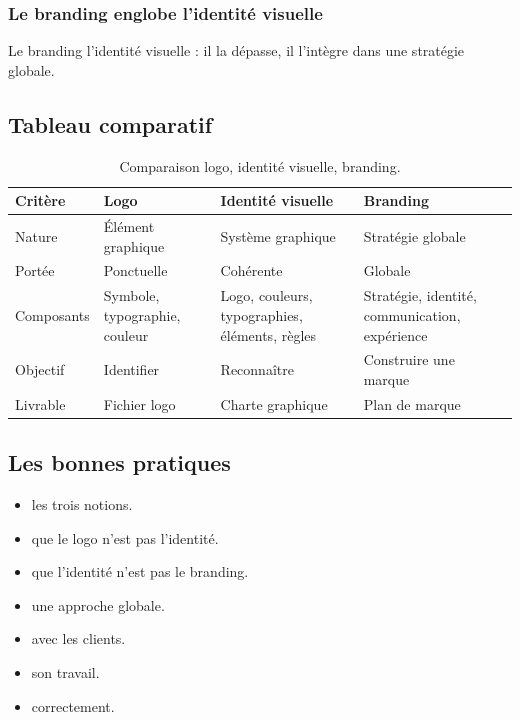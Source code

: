 \subsubsection{Le branding englobe l'identité visuelle}

Le branding  l'identité visuelle : il la dépasse, il l'intègre dans une stratégie globale.

\subsection{Tableau comparatif}

\begin{table}[h!]
\centering
\begin{tabular}{@{}p{3cm}p{4cm}p{4cm}p{3.5cm}@{}}
\toprule
\textbf{Critère} & \textbf{Logo} & \textbf{Identité visuelle} & \textbf{Branding} \\
\midrule
Nature & Élément graphique & Système graphique & Stratégie globale \\
Portée & Ponctuelle & Cohérente & Globale \\
Composants & Symbole, typographie, couleur & Logo, couleurs, typographies, éléments, règles & Stratégie, identité, communication, expérience \\
Objectif & Identifier & Reconnaître & Construire une marque \\
Livrable & Fichier logo & Charte graphique & Plan de marque \\
\bottomrule
\end{tabular}
\caption{Comparaison logo, identité visuelle, branding.}
\end{table}

\subsection{Les bonnes pratiques}

\begin{itemize}
    \item {} les trois notions.
    \item {} que le logo n'est pas l'identité.
    \item {} que l'identité n'est pas le branding.
    \item {} une approche globale.
    \item {} avec les clients.
    \item {} son travail.
    \item {} correctement.
\end{itemize}

